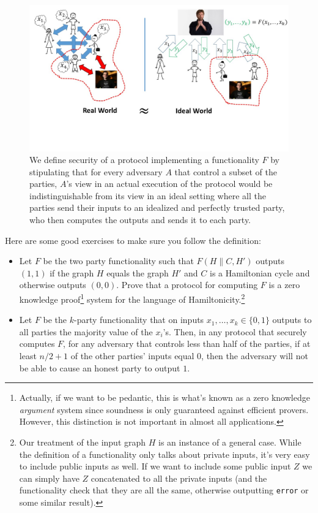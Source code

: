\begin{figure}
\centering
\includegraphics[width=\textwidth, height=0.25\paperheight, keepaspectratio]{../figure/./real-ideal.jpg}
\caption{We define security of a protocol implementing a functionality
\(F\) by stipulating that for every adversary \(A\) that control a
subset of the parties, \(A\)'s view in an actual execution of the
protocol would be indistinguishable from its view in an ideal setting
where all the parties send their inputs to an idealized and perfectly
trusted party, who then computes the outputs and sends it to each
party.}
\label{tmplabelfig}
\end{figure}

Here are some good exercises to make sure you follow the definition:

\begin{itemize}
\item
  Let \(F\) be the two party functionality such that \(F(H\|C,H')\)
  outputs \((1,1)\) if the graph \(H\) equals the graph \(H'\) and \(C\)
  is a Hamiltonian cycle and otherwise outputs \((0,0)\). Prove that a
  protocol for computing \(F\) is a zero knowledge proof\footnote{Actually,
    if we want to be pedantic, this is what's known as a zero knowledge
    \emph{argument} system since soundness is only guaranteed against
    efficient provers. However, this distinction is not important in
    almost all applications.} system for the language of
  Hamiltonicity.\footnote{Our treatment of the input graph \(H\) is an
    instance of a general case. While the definition of a functionality
    only talks about private inputs, it's very easy to include public
    inputs as well. If we want to include some public input \(Z\) we can
    simply have \(Z\) concatenated to all the private inputs (and the
    functionality check that they are all the same, otherwise outputting
    \texttt{error} or some similar result).}
\item
  Let \(F\) be the \(k\)-party functionality that on inputs
  \(x_1,\ldots,x_k \in \{0,1\}\) outputs to all parties the majority
  value of the \(x_i\)'s. Then, in any protocol that securely computes
  \(F\), for any adversary that controls less than half of the parties,
  if at least \(n/2+1\) of the other parties' inputs equal \(0\), then
  the adversary will not be able to cause an honest party to output
  \(1\).
\end{itemize}

